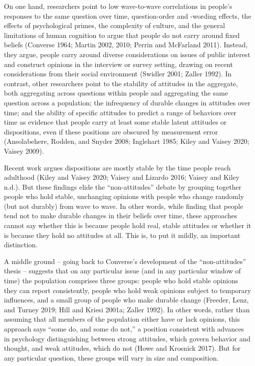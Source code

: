 \documentclass[12pt,]{article}
\begin{document}
On one hand, researchers point to low wave-to-wave correlations in people's responses to the same question over time, question-order and -wording effects, the effects of psychological primes, the complexity of culture, and the general limitations of human cognition to argue that people do not carry around fixed beliefs (Converse 1964; Martin 2002, 2010; Perrin and McFarland 2011). Instead, they argue, people carry around diverse considerations on issues of public interest and construct opinions in the interview or survey setting, drawing on recent considerations from their social environment (Swidler 2001; Zaller 1992). In contrast, other researchers point to the stability of attitudes in the aggregate, both aggregating across questions within people and aggregating the same question across a population; the infrequency of durable changes in attitudes over time; and the ability of specific attitudes to predict a range of behaviors over time as evidence that people carry at least some stable latent attitudes or dispositions, even if these positions are obscured by measurement error (Ansolabehere, Rodden, and Snyder 2008; Inglehart 1985; Kiley and Vaisey 2020; Vaisey 2009).

Recent work argues dispositions are mostly stable by the time people reach adulthood (Kiley and Vaisey 2020; Vaisey and Lizardo 2016; Vaisey and Kiley n.d.). But these findings elide the ``non-attitudes'' debate by grouping together people who hold stable, unchanging opinions with people who change randomly (but not durably) from wave to wave. In other words, while finding that people tend not to make durable changes in their beliefs over time, these approaches cannot say whether this is because people hold real, stable attitudes or whether it is because they hold no attitudes at all. This is, to put it mildly, an important distinction.

A middle ground -- going back to Converse's development of the ``non-attitudes'' thesis -- suggests that on any particular issue (and in any particular window of time) the population comprises three groups: people who hold stable opinions they can report consistently, people who hold weak opinions subject to temporary influences, and a small group of people who make durable change (Freeder, Lenz, and Turney 2019; Hill and Kriesi 2001a; Zaller 1992). In other words, rather than assuming that all members of the population either have or lack opinions, this approach says ``some do, and some do not,'' a position consistent with advances in psychology distinguishing between strong attitudes, which govern behavior and thought, and weak attitudes, which do not (Howe and Krosnick 2017). But for any particular question, these groups will vary in size and composition.
\end{document}
